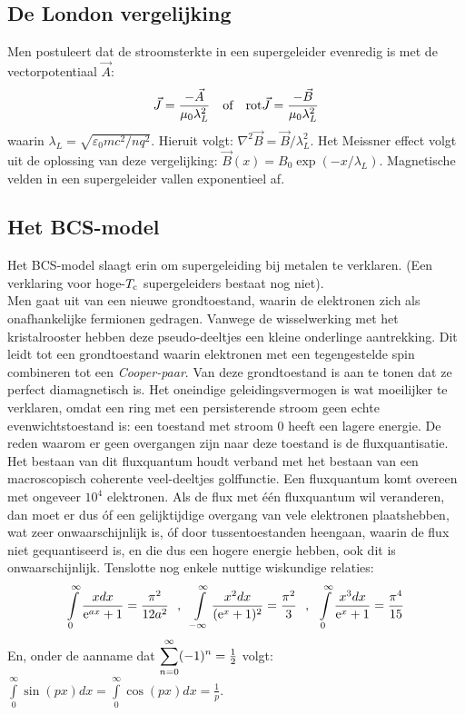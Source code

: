 \documentclass[twoside]{report}
\begin{document}
\subsection{De London vergelijking}
Men postuleert dat de stroomsterkte in een supergeleider evenredig is met de
vectorpotentiaal $\vec{A}$:
\[
\vec{J}=\frac{-\vec{A}}{\mu_0\lambda_L^2}~~~\mbox{of}~~~
{\rm rot}\vec{J}=\frac{-\vec{B}}{\mu_0\lambda_L^2}
\]
waarin $\lambda_L=\sqrt{\varepsilon_0mc^2/nq^2}$. Hieruit volgt:
$\nabla^2\vec{B}=\vec{B}/\lambda_L^2$.
\npar
Het Meissner effect volgt uit de oplossing van deze vergelijking:
$\vec{B}(x)=B_0\exp(-x/\lambda_L)$. Magnetische velden in een supergeleider
vallen exponentieel af.

\subsection{Het BCS-model}
Het BCS-model slaagt erin om supergeleiding bij metalen te verklaren. (Een
verklaring voor hoge-$T_{\rm c}$ supergeleiders bestaat nog niet).\\
Men gaat uit van een nieuwe grondtoestand, waarin de elektronen zich als
onafhankelijke fermionen gedragen. Vanwege de wisselwerking met het
kristalrooster hebben deze pseudo-deeltjes een kleine onderlinge aantrekking.
Dit leidt tot een grondtoestand waarin elektronen met een tegengestelde
spin combineren tot een {\it Cooper-paar}. Van deze grondtoestand is aan te
tonen dat ze perfect diamagnetisch is.
\npar
Het oneindige geleidingsvermogen is wat moeilijker te verklaren, omdat een
ring met een persisterende stroom geen echte evenwichtstoestand is: een
toestand met stroom 0 heeft een lagere energie. De reden waarom er geen
overgangen zijn naar deze toestand is de fluxquantisatie. Het bestaan van dit
fluxquantum houdt verband met het bestaan van een macroscopisch coherente
veel-deeltjes golffunctie. Een fluxquantum komt overeen met ongeveer $10^4$
elektronen. Als de flux met \'e\'en fluxquantum wil veranderen, dan moet er
dus \'of een gelijktijdige overgang van vele elektronen plaatshebben, wat
zeer onwaarschijnlijk is, \'of door tussentoestanden heengaan, waarin de flux
niet gequantiseerd is, en die dus een hogere energie hebben, ook dit is
onwaarschijnlijk.
\npar
Tenslotte nog enkele nuttige wiskundige relaties:
\[
\int\limits_0^\infty\frac{xdx}{{\rm e}^{ax}+1}=\frac{\pi^2}{12a^2}~~,~~
\int\limits_{-\infty}^\infty\frac{x^2dx}{({\rm e}^x+1)^2}=\frac{\pi^2}{3}~~,~~
\int\limits_0^\infty\frac{x^3dx}{{\rm e}^x+1}=\frac{\pi^4}{15}
\]
En, onder de aanname dat $\displaystyle \sum_{n=0}^\infty(-1)^n=\mbox{$\frac{1}{2}$}$ volgt:
$\displaystyle\int\limits_0^\infty\sin(px)dx=\int\limits_0^\infty\cos(px)dx=\frac{1}{p}$.
\end{document}
